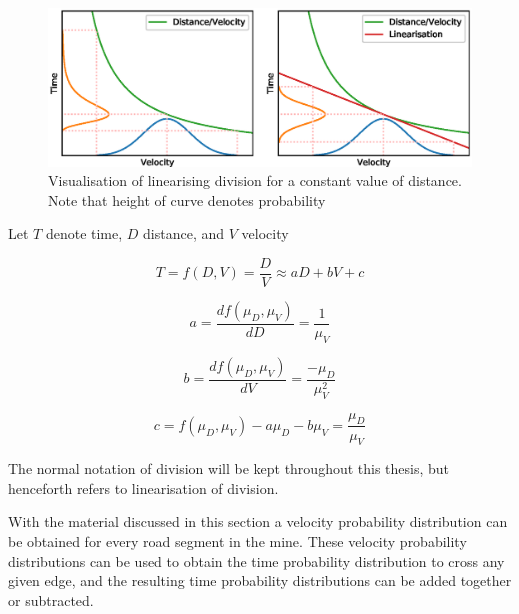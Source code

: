 \documentclass{article}
\begin{document}
			\begin{figure}[H]
				\includegraphics[scale=0.6]{linearisation.eps}
				\caption{Visualisation of linearising division for a constant value of distance.\\ Note that height of curve denotes probability}
				\label{fig:VisualiseLinearisation}
			\end{figure}

			Let $T$ denote time, $D$ distance, and $V$ velocity

			\begin{equation}
				T = f(D,V) = \frac{D}{V} \approx aD + bV + c
				\label{eq:lineraiseT}
			\end{equation}

			\begin{equation}
				a = \frac{d f(\mu_D, \mu_V)}{dD} = \frac{1}{\mu_V}
				\label{eq:linearA}
			\end{equation}

			\begin{equation}
				b = \frac{d f(\mu_D, \mu_V)}{dV} = \frac{-\mu_D}{\mu_V^2}
				\label{eq:linearB}
			\end{equation}

			\begin{equation}
				c = f(\mu_D, \mu_V) - a\mu_D - b\mu_V = \frac{\mu_D}{\mu_V}
				\label{eq:linearC}
			\end{equation}

			The normal notation of division will be kept throughout this thesis, but henceforth refers to linearisation of division.

			With the material discussed in this section a velocity probability distribution can be obtained for every road segment in the mine. These velocity probability distributions can be used to obtain the time probability distribution to cross any given edge, and the resulting time probability distributions can be added together or subtracted.
\end{document}
